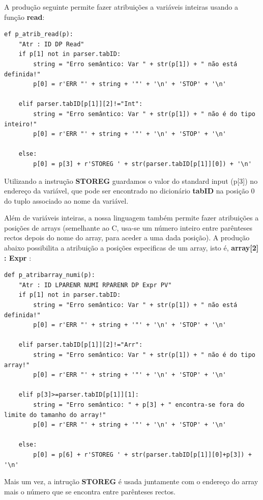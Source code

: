 \documentclass{article}
\begin{document}
\par A produção seguinte permite fazer atribuições a variáveis inteiras usando a função \textbf{read}:

\begin{lstlisting}[firstnumber=188]
ef p_atrib_read(p):
    "Atr : ID DP Read"
    if p[1] not in parser.tabID:
        string = "Erro semântico: Var " + str(p[1]) + " não está definida!"
        p[0] = r'ERR "' + string + '"' + '\n' + 'STOP' + '\n'

    elif parser.tabID[p[1]][2]!="Int":
        string = "Erro semântico: Var " + str(p[1]) + " não é do tipo inteiro!"
        p[0] = r'ERR "' + string + '"' + '\n' + 'STOP' + '\n'

    else:
        p[0] = p[3] + r'STOREG ' + str(parser.tabID[p[1]][0]) + '\n'
\end{lstlisting}

Utilizando a instrução \textbf{STOREG} guardamos o valor do standard input (p[3]) no endereço da variável, que pode ser encontrado no dicionário \textbf{tabID} na posição 0 do tuplo associado ao nome da variável.

Além de variáveis inteiras, a nossa linguagem também permite fazer atribuições a posições de arrays (semelhante ao C, usa-se um número inteiro entre parênteses rectos depois do nome do array, para aceder a uma dada posição). A produção abaixo possibilita a atribuição a posições especificas de um array, isto é, \textbf{array[2] : Expr} :

\begin{lstlisting}[firstnumber=202]
def p_atribarray_numi(p):
    "Atr : ID LPARENR NUMI RPARENR DP Expr PV"
    if p[1] not in parser.tabID:
        string = "Erro semântico: Var " + str(p[1]) + " não está definida!"
        p[0] = r'ERR "' + string + '"' + '\n' + 'STOP' + '\n'

    elif parser.tabID[p[1]][2]!="Arr":
        string = "Erro semântico: Var " + str(p[1]) + " não é do tipo array!"
        p[0] = r'ERR "' + string + '"' + '\n' + 'STOP' + '\n'

    elif p[3]>=parser.tabID[p[1]][1]:
        string = "Erro semântico: " + p[3] + " encontra-se fora do limite do tamanho do array!"
        p[0] = r'ERR "' + string + '"' + '\n' + 'STOP' + '\n'

    else:
        p[0] = p[6] + r'STOREG ' + str(parser.tabID[p[1]][0]+p[3]) + '\n'
\end{lstlisting}

Mais um vez, a intrução \textbf{STOREG} é usada juntamente com o endereço do array mais o número que se encontra entre parênteses rectos.
\end{document}
